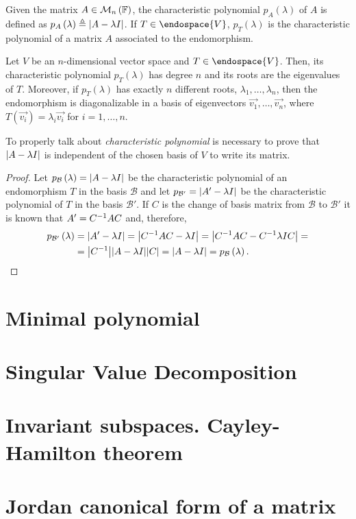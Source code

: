\begin{defn}
    Given the matrix $A\in\mathcal{M}_n\left( \field \right) $, the characteristic polynomial $p_A\left(
    \lambda \right) $ of $A$ is defined as $p_A\left( \lambda \right) \triangleq \abs{A - \lambda I}$. If
    $T\in\endospace{V}$, $p_T\left( \lambda \right) $ is the characteristic polynomial of a matrix $A$
    associated to the endomorphism.
\end{defn}

\begin{coro}
    Let $V$ be an $n$-dimensional vector space and $T\in\endospace{V}$. Then, its characteristic polynomial
    $p_T
    \left( \lambda \right) $ has degree $n$ and its roots are the eigenvalues of $T$. Moreover, if $p_T\left(
    \lambda\right) $ has exactly $n$ different roots, $\lambda_1, \ldots, \lambda_n$, then the endomorphism
    is diagonalizable in a basis of eigenvectors $\vec{v_1}, \ldots, \vec{v_n}$, where $T\left( \vec{v_i}
    \right) = \lambda_i\vec{v_i}$ for $i = 1, \ldots, n$.
\end{coro}

To properly talk about \textit{characteristic polynomial} is necessary to prove that $\abs{A - \lambda I}$
is independent of the chosen basis of $V$ to write its matrix.

\begin{proof}
    Let $p_\mathcal{B}\left( \lambda \right) = \abs{A - \lambda I}$ be the characteristic polynomial of an
    endomorphism $T$ in the basis $\mathcal{B}$ and let $p_\mathcal{B'} = \abs{A' - \lambda I}$ be the
    characteristic polynomial of $T$ in the basis $\mathcal{B'}$. If $C$ is the change of basis matrix from
    $\mathcal{B}$ to $\mathcal{B'}$ it is known that $A' = C ^{-1}AC$ and, therefore,
    \begin{align}
        p_\mathcal{B'}\left( \lambda \right)  &= \abs{A' - \lambda I} = \abs{C ^{-1}AC - \lambda I} =
        \abs{C ^{-1}AC - C ^{-1}\lambda IC} = \\ &= \abs{C ^{-1}}\abs{A - \lambda I}\abs{C} =
        \abs{A - \lambda I} = p_\mathcal{B}\left( \lambda \right).
    \end{align}
\end{proof}



\section{Minimal polynomial}

\section{Singular Value Decomposition}

\section{Invariant subspaces. Cayley-Hamilton theorem}

\section{Jordan canonical form of a matrix}
